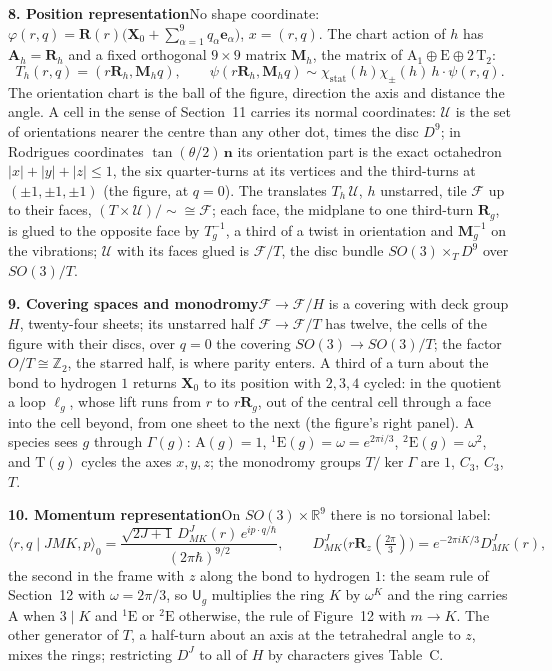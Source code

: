 \documentclass[12pt]{article}
\newcommand{\R}{\mathbb{R}}
\newcommand{\act}{\mathbin{\cdot}}
\newcommand{\stat}{\chi_{\mathrm{stat}}}
\newcommand{\X}{\mathbf{X}}                 %
\newcommand{\Rmat}{\mathbf{R}}              %
\newcommand{\Uop}[1]{\mathsf{U}_{#1}}       %
\begin{document}
{\noindent\textbf{8. Position representation}\quad No shape coordinate:
$\varphi(r,q)=\Rmat(r)\bigl(\X_0+\sum_{\alpha=1}^{9}q_\alpha\mathbf e_\alpha\bigr)$, $x=(r,q)$. The chart action of
$h$ has $\mathbf A_h=\Rmat_h$ and a fixed orthogonal $9\times9$ matrix $\mathbf M_h$, the matrix of $\mathrm
A_1\oplus\mathrm E\oplus2\,\mathrm T_2$:
\[
T_h(r,q)=(r\Rmat_h,\mathbf M_hq),\qquad
\psi(r\Rmat_h,\mathbf M_hq)\sim\stat(h)\chi_\pm(h)\,h\act\psi(r,q).
\]
The orientation chart is the ball of the figure, direction the axis and distance the angle. A cell in the sense of
Section~11 carries its normal coordinates: $\mathcal U$ is the set of orientations nearer the centre than any other
dot, times the disc $D^9$; in Rodrigues coordinates $\tan(\theta/2)\,\mathbf n$ its orientation part is the exact
octahedron $|x|+|y|+|z|\le1$, the six quarter-turns at its vertices and the third-turns at $(\pm1,\pm1,\pm1)$ (the
figure, at $q=0$). The translates $T_h\,\mathcal U$, $h$ unstarred, tile $\mathcal F$ up to their faces,
$(T\times\mathcal U)/{\sim}\cong\mathcal F$; each face, the midplane to one third-turn $\Rmat_g$, is glued to the
opposite face by $T_g^{-1}$, a third of a twist in orientation and $\mathbf M_g^{-1}$ on the vibrations; $\mathcal
U$ with its faces glued is $\mathcal F/T$, the disc bundle $SO(3)\times_T D^9$ over $SO(3)/T$.

\noindent\textbf{9. Covering spaces and monodromy}\quad $\mathcal F\to\mathcal F/H$ is a covering with deck group
$H$, twenty-four sheets; its unstarred half $\mathcal F\to\mathcal F/T$ has twelve, the cells of the figure with
their discs, over $q=0$ the covering $SO(3)\to SO(3)/T$; the factor $O/T\cong\mathbb Z_2$, the starred half, is
where parity enters. A third of a turn about the bond to hydrogen $1$ returns $\X_0$ to its position with $2,3,4$
cycled: in the quotient a loop $\ell_g$, whose lift runs from $r$ to $r\Rmat_g$, out of the central cell through a
face into the cell beyond, from one sheet to the next (the figure's right panel). A species sees $g$ through
$\Gamma(g)$: $\mathrm A(g)=1$, ${}^1\mathrm E(g)=\omega=e^{2\pi i/3}$, ${}^2\mathrm E(g)=\omega^2$, and $\mathrm
T(g)$ cycles the axes $x,y,z$; the monodromy groups $T/\ker\Gamma$ are $1$, $C_3$, $C_3$, $T$.

\noindent\textbf{10. Momentum representation}\quad On $SO(3)\times\R^9$ there is no torsional label:
\[
\langle r,q\mid JMK,p\rangle_0=\frac{\sqrt{2J+1}\,D^J_{MK}(r)\,e^{ip\cdot q/\hbar}}{(2\pi\hbar)^{9/2}},
\qquad
D^J_{MK}\bigl(r\Rmat_z(\tfrac{2\pi}{3})\bigr)=e^{-2\pi iK/3}D^J_{MK}(r),
\]
the second in the frame with $z$ along the bond to hydrogen $1$: the seam rule of Section~12 with $\omega=2\pi/3$,
so $\Uop{g}$ multiplies the ring $K$ by $\omega^K$ and the ring carries $\mathrm A$ when $3\mid K$ and ${}^1\mathrm
E$ or ${}^2\mathrm E$ otherwise, the rule of Figure~12 with $m\to K$. The other generator of $T$, a half-turn about
an axis at the tetrahedral angle to $z$, mixes the rings; restricting $D^J$ to all of $H$ by characters gives
Table~C.

}
\end{document}
